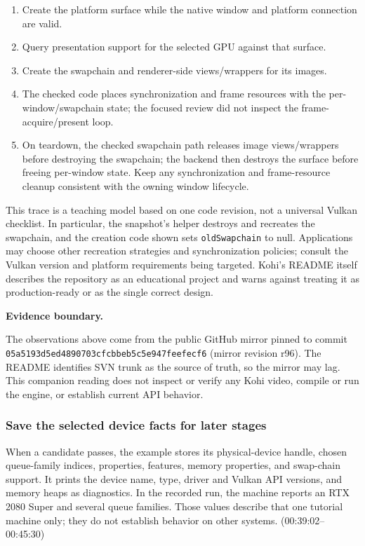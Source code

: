 \begin{enumerate}
\def\labelenumi{\arabic{enumi}.}
\tightlist
\item
  Create the platform surface while the native window and platform connection are valid.
\item
  Query presentation support for the selected GPU against that surface.
\item
  Create the swapchain and renderer-side views/wrappers for its images.
\item
  The checked code places synchronization and frame resources with the per-window/swapchain state; the focused review did not inspect the frame-acquire/present loop.
\item
  On teardown, the checked swapchain path releases image views/wrappers before destroying the swapchain; the backend then destroys the surface before freeing per-window state. Keep any synchronization and frame-resource cleanup consistent with the owning window lifecycle.
\end{enumerate}

This trace is a teaching model based on one code revision, not a universal Vulkan checklist. In particular, the snapshot's helper destroys and recreates the swapchain, and the creation code shown sets \texttt{oldSwapchain} to null. Applications may choose other recreation strategies and synchronization policies; consult the Vulkan version and platform requirements being targeted. Kohi's README itself describes the repository as an educational project and warns against treating it as production-ready or as the single correct design.

\textbf{Evidence boundary.}

The observations above come from the public GitHub mirror pinned to commit \texttt{05a5193d5ed4890703cfcbbeb5c5e947feefecf6} (mirror revision r96). The README identifies SVN trunk as the source of truth, so the mirror may lag. This companion reading does not inspect or verify any Kohi video, compile or run the engine, or establish current API behavior.

\subsubsection{Save the selected device facts for later stages}\label{06-engine-ii-ch025-save-the-selected-device-facts-for-later-stages}

When a candidate passes, the example stores its physical-device handle, chosen queue-family indices, properties, features, memory properties, and swap-chain support. It prints the device name, type, driver and Vulkan API versions, and memory heaps as diagnostics. In the recorded run, the machine reports an RTX 2080 Super and several queue families. Those values describe that one tutorial machine only; they do not establish behavior on other systems. (00:39:02--00:45:30)

